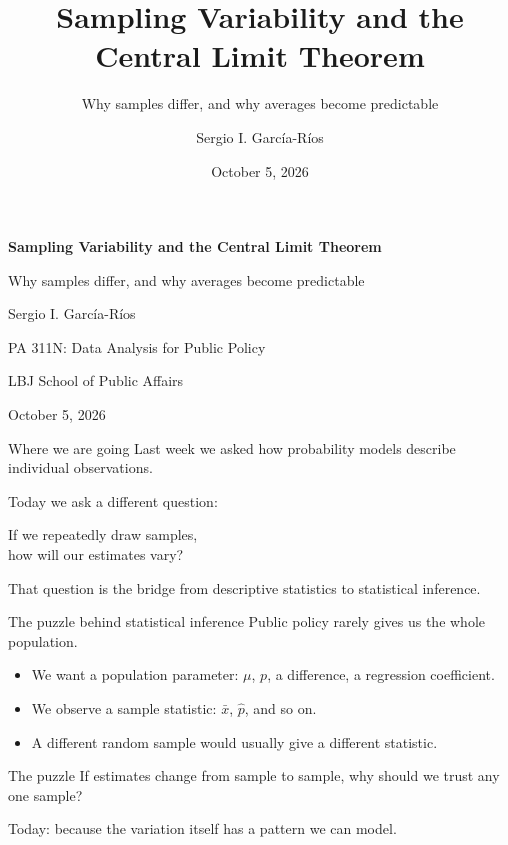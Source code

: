 \documentclass[11pt,aspectratio=169]{beamer}
\author{Sergio I. Garc\'ia-R\'ios}
\title{Sampling Variability and the Central Limit Theorem}
\subtitle{Why samples differ, and why averages become predictable}
\institute{PA 311N: Data Analysis for Public Policy\\LBJ School of Public Affairs}
\date{October 5, 2026}
\begin{document}
\begin{frame}[plain]
\centering
\vspace{0.6cm}
{\color{LBJnavy}\LARGE\bfseries Sampling Variability and the Central Limit Theorem\par}
\vspace{0.4cm}
{\large Why samples differ, and why averages become predictable\par}
\vspace{0.9cm}
{\normalsize Sergio I. Garc\'ia-R\'ios\par}
\vspace{0.2cm}
{\small PA 311N: Data Analysis for Public Policy\par}
{\small LBJ School of Public Affairs\par}
\vfill
{\small October 5, 2026\par}
\end{frame}

\begin{frame}{Where we are going}
Last week we asked how probability models describe \alert{individual observations}.

\vspace{0.7em}
Today we ask a different question:

\begin{center}
\Large If we repeatedly draw samples,\\
\alert{how will our estimates vary?}
\end{center}

\vspace{0.7em}
That question is the bridge from descriptive statistics to statistical inference.
\end{frame}

\begin{frame}{The puzzle behind statistical inference}
Public policy rarely gives us the whole population.

\begin{itemize}
  \item We want a \alert{population parameter}: $\mu$, $p$, a difference, a regression coefficient.
  \item We observe a \alert{sample statistic}: $\bar{x}$, $\hat p$, and so on.
  \item A different random sample would usually give a different statistic.
\end{itemize}

\vspace{0.8em}
\begin{alertblock}{The puzzle}
If estimates change from sample to sample, why should we trust any one sample?
\end{alertblock}

\vfill
Today: because the variation itself has a pattern we can model.
\end{frame}
\end{document}
